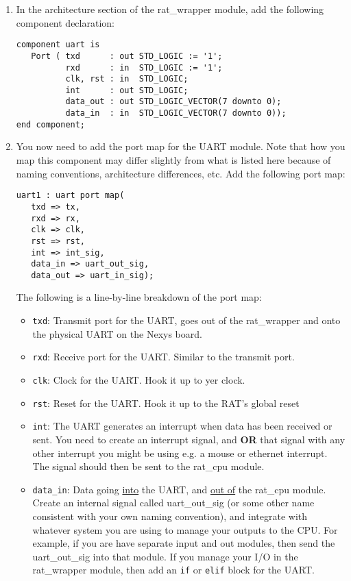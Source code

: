 \documentclass[notitlepage]{article}
\begin{document}
\begin{enumerate}
\item In the architecture section of the rat\_wrapper module, add the following component declaration:
\begin{verbatim}
component uart is
   Port ( txd      : out STD_LOGIC := '1';
          rxd      : in  STD_LOGIC := '1';
          clk, rst : in  STD_LOGIC;
          int      : out STD_LOGIC;
          data_out : out STD_LOGIC_VECTOR(7 downto 0);
          data_in  : in  STD_LOGIC_VECTOR(7 downto 0));
end component;
\end{verbatim}

\item You now need to add the port map for the UART module. Note that how you map this component may differ slightly from what is listed here because of naming conventions, architecture differences, etc. Add the following port map:
\begin{verbatim}
uart1 : uart port map(
   txd => tx,
   rxd => rx,
   clk => clk,
   rst => rst,
   int => int_sig,
   data_in => uart_out_sig,
   data_out => uart_in_sig);
\end{verbatim}
The following is a line-by-line breakdown of the port map:
\begin{itemize}
\item \texttt{txd}: Transmit port for the UART, goes out of the rat\_wrapper and onto the physical UART on the Nexys board.
\item \texttt{rxd}: Receive port for the UART. Similar to the transmit port.
\item \texttt{clk}: Clock for the UART. Hook it up to yer clock. 
\item \texttt{rst}: Reset for the UART. Hook it up to the RAT's global reset
\item \texttt{int}: The UART generates an interrupt when data has been received or sent. You need to create an interrupt signal, and \textbf{OR} that signal with any other interrupt you might be using e.g. a mouse or ethernet interrupt. The signal should then be sent to the rat\_cpu module.
\item \texttt{data\_in}: Data going \underline{into} the UART, and \underline{out of} the rat\_cpu module. Create an internal signal called uart\_out\_sig (or some other name consistent with your own naming convention), and integrate with whatever system you are using to manage your outputs to the CPU. For example, if you are have separate input and out modules, then send the uart\_out\_sig into that module. If you manage your I/O in the rat\_wrapper module, then add an \texttt{if} or \texttt{elif} block for the UART.

\end{itemize}
\end{enumerate}
\end{document}
